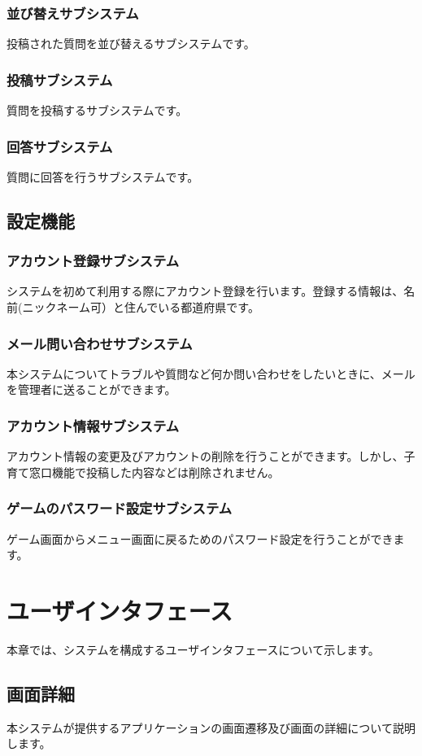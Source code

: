 \documentclass[a4j]{jarticle}
\begin{document}
\subsubsection*{並び替えサブシステム}
投稿された質問を並び替えるサブシステムです。
\subsubsection*{投稿サブシステム}
質問を投稿するサブシステムです。
\subsubsection*{回答サブシステム}
質問に回答を行うサブシステムです。

\subsection{設定機能}
\subsubsection*{アカウント登録サブシステム}
システムを初めて利用する際にアカウント登録を行います。登録する情報は、名前(ニックネーム可）と住んでいる都道府県です。
\subsubsection*{メール問い合わせサブシステム}
本システムについてトラブルや質問など何か問い合わせをしたいときに、メールを管理者に送ることができます。
\subsubsection*{アカウント情報サブシステム}
アカウント情報の変更及びアカウントの削除を行うことができます。しかし、子育て窓口機能で投稿した内容などは削除されません。
\subsubsection*{ゲームのパスワード設定サブシステム}
ゲーム画面からメニュー画面に戻るためのパスワード設定を行うことができます。

\newpage
\section{ユーザインタフェース}
本章では、システムを構成するユーザインタフェースについて示します。

\subsection{画面詳細}
本システムが提供するアプリケーションの画面遷移及び画面の詳細について説明します。
\end{document}
